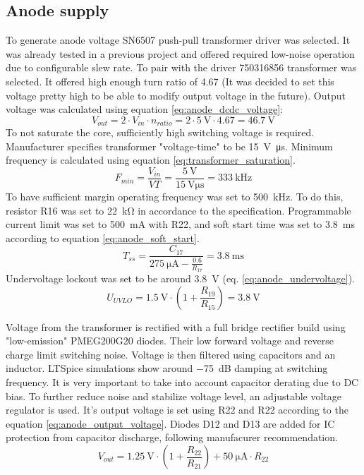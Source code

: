 \documentclass{article}
\begin{document}
\subsection{Anode supply}
To generate anode voltage SN6507 push-pull transformer driver was selected. It was already tested in a previous project and offered required low-noise operation due to configurable slew rate.
To pair with the driver 750316856 transformer was selected. It offered high enough turn ratio of \num{4.67} (It was decided to set this voltage pretty high to be able to modify output voltage in the future).
Output voltage was calculated using equation \ref{eq:anode_dcdc_voltage}:
\begin{equation}
	V_{out} = 2\cdot V_{in} \cdot n_{ratio}  = 2 \cdot \SI{5}{\volt} \cdot \num{4.67} = \SI{46.7}{\volt}
	\label{eq:anode_dcdc_voltage}
\end{equation}
To not saturate the core, sufficiently high switching voltage is required. Manufacturer specifies transformer "voltage-time" to be \SI{15}{\volt\micro\second}.
Minimum frequency is calculated using equation \ref{eq:transformer_saturation}.
\begin{equation}
	F_{min} = \frac{V_{in}}{VT} = \frac{\SI{5}{\volt}}{\SI{15}{\volt\micro\second}} = \SI{333}{\kilo\hertz}
	\label{eq:transformer_saturation}
\end{equation}
To have sufficient margin operating frequency was set to \SI{500}{\kilo\hertz}. To do this, resistor R16 was set to \SI{22}{\kilo\ohm} in accordance to the specification.
Programmable current limit was set to \SI{500}{\milli\ampere} with R22, and soft start time was set to \SI{3.8}{\milli\second} according to equation \ref{eq:anode_soft_start}.
\begin{equation}
	T_{ss} = \frac{C_{17}}{\SI{275}{\micro\ampere}-\frac{0.6}{R_{17}}} = \SI{3.8}{\milli\second}
	\label{eq:anode_soft_start}
\end{equation}
Undervoltage lockout was set to be around \SI{3.8}{\volt} (eq. \ref{eq:anode_undervoltage}).
\begin{equation}
	U_{UVLO} = \SI{1.5}{\volt} \cdot \left(1+\frac{R_{19}}{R_{15}}\right) = \SI{3.8}{\volt}
	\label{eq:anode_undervoltage}
\end{equation}

Voltage from the transformer is rectified with a full bridge rectifier build using "low-emission" PMEG200G20 diodes. Their low forward voltage and reverse charge limit switching noise.
Voltage is then filtered using capacitors and an inductor. LTSpice simulations show around \SI{-75}{\deci\bel} damping at switching frequency. It is very important to take into account capacitor derating due to DC bias.
To further reduce noise and stabilize voltage level, an adjustable voltage regulator is used.
It's output voltage is set using R22 and R22 according to the equation \ref{eq:anode_output_voltage}. Diodes D12 and D13 are added for IC protection from capacitor discharge, following manufacurer recommendation.
\begin{equation}
	V_{out}= \SI{1.25}{\volt}\cdot\left(1+\frac{R_{22}}{R_{21}}\right) + \SI{50}{\micro\ampere}\cdot R_{22}
	\label{eq:anode_output_voltage}
\end{equation}
\end{document}
